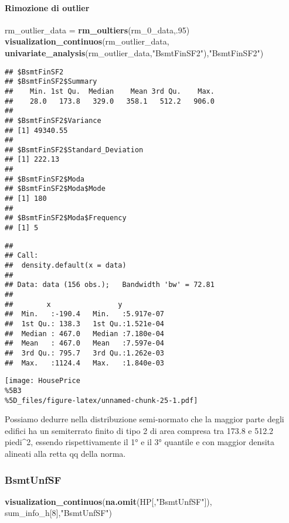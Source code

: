 \documentclass[
]{article}
\newenvironment{Shaded}{\begin{snugshade}}{\end{snugshade}}
\newcommand{\DecValTok}[1]{\textcolor[rgb]{0.00,0.00,0.81}{#1}}
\newcommand{\FunctionTok}[1]{\textcolor[rgb]{0.13,0.29,0.53}{\textbf{#1}}}
\newcommand{\NormalTok}[1]{#1}
\newcommand{\OtherTok}[1]{\textcolor[rgb]{0.56,0.35,0.01}{#1}}
\newcommand{\StringTok}[1]{\textcolor[rgb]{0.31,0.60,0.02}{#1}}
\begin{document}
\paragraph{Rimozione di outlier}\label{rimozione-di-outlier-3}

\begin{Shaded}
\begin{Highlighting}[]
\NormalTok{rm\_outlier\_data }\OtherTok{=} \FunctionTok{rm\_oultiers}\NormalTok{(rm\_0\_data,.}\DecValTok{95}\NormalTok{)}
\FunctionTok{visualization\_continuos}\NormalTok{(rm\_outlier\_data, }\FunctionTok{univariate\_analysis}\NormalTok{(rm\_outlier\_data,}\StringTok{"BsmtFinSF2"}\NormalTok{),}\StringTok{"BsmtFinSF2"}\NormalTok{)}
\end{Highlighting}
\end{Shaded}

\begin{verbatim}
## $BsmtFinSF2
## $BsmtFinSF2$Summary
##    Min. 1st Qu.  Median    Mean 3rd Qu.    Max. 
##    28.0   173.8   329.0   358.1   512.2   906.0 
## 
## $BsmtFinSF2$Variance
## [1] 49340.55
## 
## $BsmtFinSF2$Standard_Deviation
## [1] 222.13
## 
## $BsmtFinSF2$Moda
## $BsmtFinSF2$Moda$Mode
## [1] 180
## 
## $BsmtFinSF2$Moda$Frequency
## [1] 5
\end{verbatim}

\begin{verbatim}
## 
## Call:
##  density.default(x = data)
## 
## Data: data (156 obs.);   Bandwidth 'bw' = 72.81
## 
##        x                y            
##  Min.   :-190.4   Min.   :5.917e-07  
##  1st Qu.: 138.3   1st Qu.:1.521e-04  
##  Median : 467.0   Median :7.180e-04  
##  Mean   : 467.0   Mean   :7.597e-04  
##  3rd Qu.: 795.7   3rd Qu.:1.262e-03  
##  Max.   :1124.4   Max.   :1.840e-03
\end{verbatim}

\texttt{[image: HousePrice\\\%5B3\\\%5D\_files/figure-latex/unnamed-chunk-25-1.pdf]}

Possiamo dedurre nella distribuzione semi-normato che la maggior parte
degli edifici ha un semiterrato finito di tipo 2 di area compresa tra
173.8 e 512.2 piedi\^{}2, essendo rispettivamente il 1° e il 3° quantile
e con maggior densita alineati alla retta qq della norma.

\subsubsection{BsmtUnfSF}\label{bsmtunfsf}

\begin{Shaded}
\begin{Highlighting}[]
\FunctionTok{visualization\_continuos}\NormalTok{(}\FunctionTok{na.omit}\NormalTok{(HP[,}\StringTok{"BsmtUnfSF"}\NormalTok{]), sum\_info\_h[}\DecValTok{8}\NormalTok{],}\StringTok{"BsmtUnfSF"}\NormalTok{)}
\end{Highlighting}
\end{Shaded}
\end{document}
